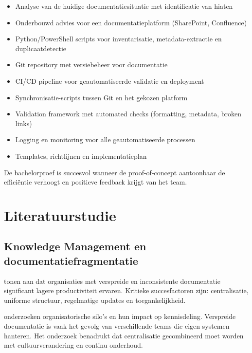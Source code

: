 \begin{itemize}
  \item Analyse van de huidige documentatie\-situatie met identificatie van hiaten
  \item Onderbouwd advies voor een documentatie\-platform (Share\-Point, Confluence)
  \item Python/\allowbreak Power\-Shell scripts voor inventari\-satie, meta\-data-extractie en duplicaat\-detectie
  \item Git repository met versiebeheer voor documentatie
  \item CI/CD pipeline voor geautomatiseerde validatie en deployment
  \item Synchronisatie-scripts tussen Git en het gekozen platform
  \item Validation framework met automated checks (formatting, metadata, broken links)
  \item Logging en monitoring voor alle geautomatiseerde processen
  \item Templates, richtlijnen en implementatie\-plan
\end{itemize}

De bachelorproef is succesvol wanneer de proof-of-concept aantoonbaar de efficiëntie verhoogt en positieve feedback krijgt van het team.


\section{Literatuurstudie}%
\label{sec:literatuurstudie}

\subsection{Knowledge Management en documentatiefragmentatie}

\textcite{Abbas2022} tonen aan dat organisaties met verspreide en inconsistente documentatie significant lagere productiviteit ervaren. Kritieke succesfactoren zijn: centralisatie, uniforme structuur, regelmatige updates en toegankelijkheid.

\textcite{Bento2020} onderzoeken organisatorische silo's en hun impact op kennisdeling. Verspreide documentatie is vaak het gevolg van verschillende teams die eigen systemen hanteren. Het onderzoek benadrukt dat centralisatie gecombineerd moet worden met cultuurverandering en continu onderhoud.

